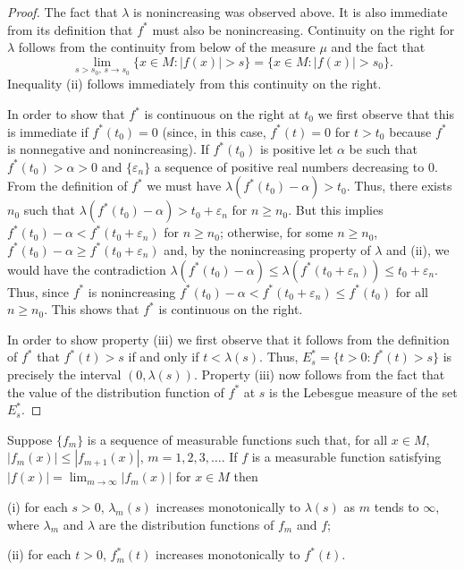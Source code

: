 \begin{proof}
The fact that $\lambda$ is nonincreasing was observed above. It is also
immediate from its definition that $f^{*}$ must also be nonincreasing.
Continuity on the right for $\lambda$ follows from the continuity from below
of the measure $\mu$ and the fact that
\[
\lim_{s>s_{0},\, s \to s_{0}}\{x \in M : |f(x)| > s\}=\{x \in M : |f(x)| > s_{0}\}.
\]
Inequality (ii) follows immediately from this continuity on the right.

In order to show that $f^{*}$ is continuous on the right at $t_{0}$ we first
observe that this is immediate if $f^{*}(t_{0}) = 0$ (since, in this case,
$f^{*}(t) = 0$ for $t > t_{0}$ because $f^{*}$ is nonnegative and
nonincreasing). If $f^{*}(t_{0})$ is positive let $\alpha$ be such that
$f^{*}(t_{0}) > \alpha > 0$ and $\{\varepsilon_{n}\}$ a sequence of positive
real numbers decreasing to 0. From the definition of $f^{*}$ we must have
$\lambda(f^{*}(t_{0}) - \alpha) > t_{0}$. Thus, there exists $n_{0}$ such that
$\lambda(f^{*}(t_{0}) - \alpha) > t_{0} + \varepsilon_{n}$ for $n \geq n_{0}$.
But this implies $f^{*}(t_{0}) - \alpha < f^{*}(t_{0} + \varepsilon_{n})$ for
$n \geq n_{0}$; otherwise, for some $n \geq n_{0}$,
$f^{*}(t_{0}) - \alpha \geq f^{*}(t_{0} + \varepsilon_{n})$ and, by the
nonincreasing property of $\lambda$ and (ii), we would have the contradiction
$\lambda(f^{*}(t_{0}) - \alpha) \leq \lambda(f^{*}(t_{0} + \varepsilon_{n})) \leq t_{0} + \varepsilon_{n}$.
Thus, since $f^{*}$ is nonincreasing
$f^{*}(t_{0}) - \alpha < f^{*}(t_{0} + \varepsilon_{n}) \leq f^{*}(t_{0})$ for
all $n \geq n_{0}$. This shows that $f^{*}$ is continuous on the right.

In order to show property (iii) we first observe that it follows from the
definition of $f^{*}$ that $f^{*}(t) > s$ if and only if $t < \lambda(s)$.
Thus, $E_{s}^{*} = \{t > 0 : f^{*}(t) > s\}$ is precisely the interval
$(0, \lambda(s))$. Property (iii) now follows from the fact that the value of
the distribution function of $f^{*}$ at $s$ is the Lebesgue measure of the set
$E_{s}^{*}$.
\end{proof}

\begin{lemma}\label{lem:c5-3-5}
Suppose $\{f_{m}\}$ is a sequence of measurable functions such that, for all
$x \in M$, $|f_{m}(x)| \leq |f_{m+1}(x)|$, $m = 1, 2, 3, \ldots$. If $f$ is a
measurable function satisfying $|f(x)| = \lim_{m \to \infty}|f_{m}(x)|$ for
$x \in M$ then

\textup{(i)} for each $s > 0$, $\lambda_{m}(s)$ increases monotonically to
$\lambda(s)$ as $m$ tends to $\infty$, where $\lambda_{m}$ and $\lambda$ are
the distribution functions of $f_{m}$ and $f$;

\textup{(ii)} for each $t > 0$, $f_{m}^{*}(t)$ increases monotonically to
$f^{*}(t)$.
\end{lemma}

